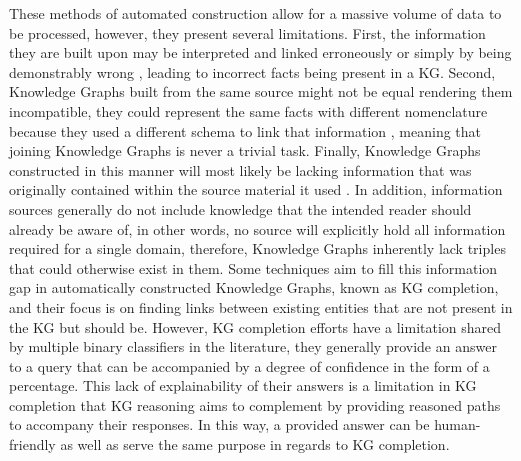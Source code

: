These methods of automated construction allow for a massive volume of data to be processed, however, they present several limitations.
First, the information they are built upon may be interpreted and linked erroneously or simply by being demonstrably wrong \cite{martinez2020information}, leading to incorrect facts being present in a KG. 
Second, Knowledge Graphs built from the same source might not be equal rendering them incompatible, they could represent the same facts with different nomenclature because they used a different schema to link that information \cite{choi2006survey}, meaning that joining Knowledge Graphs is never a trivial task.
Finally, Knowledge Graphs constructed in this manner will most likely be lacking information that was originally contained within the source material it used \cite{bordes2014constructing}. In addition, information sources generally do not include knowledge that the intended reader should already be aware of, in other words, no source will explicitly hold all information required for a single domain, therefore, Knowledge Graphs inherently lack triples that could otherwise exist in them.
Some techniques aim to fill this information gap in automatically constructed Knowledge Graphs, known as KG completion, and their focus is on finding links between existing entities that are not present in the KG but should be. However, KG completion efforts have a limitation shared by multiple binary classifiers in the literature, they generally provide an answer to a query that can be accompanied by a degree of confidence in the form of a percentage. This lack of explainability of their answers is a limitation in KG completion that KG reasoning aims to complement by providing reasoned paths to accompany their responses. In this way, a provided answer can be human-friendly as well as serve the same purpose in regards to KG completion.

